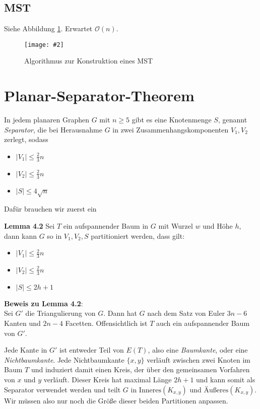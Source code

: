 \documentclass[10pt,a4paper]{article}
\makeatletter
\def\maxwidth#1{\ifdim\Gin@nat@width>#1 #1\else\Gin@nat@width\fi}
\newcommand{\imageFigure}[4]{%
    \begin{figure}[h]%
        \centering%
        {%
            \setlength{\fboxsep}{1pt}%
            \setlength{\fboxrule}{1pt}%
            \texttt{[image: \#2]}%
        }%
        \caption{#1}%
        \label{fig:#4}%
    \end{figure}%
}
\makeatother
\begin{document}
\subsection{MST}
Siehe Abbildung \ref{fig:mst}. Erwartet $\mathcal{O}(n)$.
\imageFigure{Algorithmus zur Konstruktion eines MST}{mst.png}{.8}{mst}


\clearpage
\section{Planar-Separator-Theorem}
In jedem planaren Graphen $G$ mit $n \geq 5$ gibt es eine Knotenmenge $S$,
genannt \textit{Separator}, die bei Herausnahme $G$ in zwei
Zusammenhangskomponenten $V_1, V_2$ zerlegt, sodass

\begin{itemize}
    \item $|V_1| \leq \frac{2}{3}n$
    \item $|V_2| \leq \frac{2}{3}n$
    \item $|S| \leq 4\sqrt{n}$
\end{itemize}

Dafür brauchen wir zuerst ein

\textbf{Lemma 4.2} Sei $T$ ein aufspannender Baum in $G$ mit Wurzel $w$ und
Höhe $h$, dann kann $G$ so in $V_1, V_2, S$ partitioniert werden, dass gilt:
\begin{itemize}
    \item $|V_1| \leq \frac{2}{3}n$
    \item $|V_2| \leq \frac{2}{3}n$
    \item $|S| \leq 2h+1$
\end{itemize}

\textbf{Beweis zu Lemma 4.2}:\\
Sei $G'$ die Triangulierung von $G$.
Dann hat $G$ nach dem Satz von Euler $3n-6$ Kanten und $2n-4$ Facetten.
Offensichtlich ist $T$ auch ein aufspannender Baum von $G'$.

Jede Kante in $G'$ ist entweder Teil von $E(T)$, also eine \textit{Baumkante},
oder eine \textit{Nichtbaumkante}.
Jede Nichtbaumkante $\{x,y\}$ verläuft zwischen zwei Knoten im Baum $T$ und
induziert damit einen Kreis, der über den gemeinsamen Vorfahren von $x$ und $y$
verläuft.
Dieser Kreis hat maximal Länge $2h+1$ und kann somit als Separator verwendet
werden und teilt $G$ in $\text{Inneres}(K_{x,y})$ und
$\text{Äußeres}(K_{x,y})$.
Wir müssen also nur noch die Größe dieser beiden Partitionen anpassen.
\end{document}
